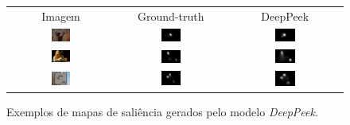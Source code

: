 \documentclass[11pt]{article}
\newcommand{\tit}[1]{\textit{#1}}
\begin{document}
\begin{figure}[H]
\begin{center}
		\begin{tabular} {ccc}
        Imagem & Ground-truth & DeepPeek\\
		\includegraphics[width=0.19\textwidth]{./img/monkey_s.jpg} &
        \includegraphics[width=0.19\textwidth]{./img/monkey_gt.jpg} &
		\includegraphics[width=0.19\textwidth]{./img/monkey_m.jpg}\\
		\includegraphics[width=0.19\textwidth]{./img/person_s.jpg} &
        \includegraphics[width=0.19\textwidth]{./img/person_gt.jpg} &
		\includegraphics[width=0.19\textwidth]{./img/person_m.jpg}\\
		\includegraphics[width=0.19\textwidth]{./img/sign_s.jpg} &
        \includegraphics[width=0.19\textwidth]{./img/sign_gt.jpg} &
		\includegraphics[width=0.19\textwidth]{./img/sign_m.jpg}\\
		\end{tabular}
\end{center}
\caption{Exemplos de mapas de saliência gerados pelo modelo \tit{DeepPeek}.}
\label{fig:preds}
\end{figure}
\end{document}
